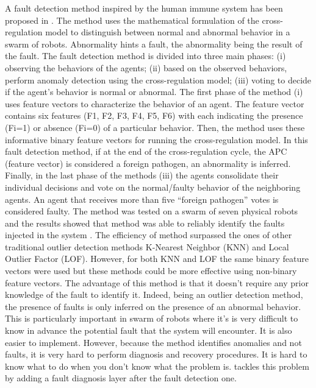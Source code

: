 A fault detection method inspired by the human immune system has been proposed in \cite{ tarapore2015err, tarapore2017generic}. The method uses the mathematical formulation of the cross-regulation model to distinguish between normal and abnormal behavior in a swarm of robots. Abnormality hints a fault, the abnormality being the result of the fault. The fault detection method is divided into three main phases: (i) observing the behaviors of the agents; (ii) based on the observed behaviors, perform anomaly detection using the cross-regulation model; (iii) voting to decide if the agent’s behavior is normal or abnormal.  The first phase of the method (i) uses feature vectors to characterize the behavior of an agent. The feature vector contains six features (F1, F2, F3, F4, F5, F6) with each indicating the presence (Fi=1) or absence (Fi=0) of a particular behavior. Then, the method uses these informative binary feature vectors for running the cross-regulation model. In this fault detection method, if at the end of the cross-regulation cycle, the APC (feature vector) is considered a foreign pathogen, an abnormality is inferred. Finally, in the last phase of the methods (iii) the agents consolidate their individual decisions and vote on the normal/faulty behavior of the neighboring agents. An agent that receives more than five “foreign pathogen” votes is considered faulty. The method was tested on a swarm of seven physical robots and the results showed that method was able to reliably identify the faults injected in the system \cite{tarapore2019fault}. The efficiency of method surpassed the ones of other traditional outlier detection methods K-Nearest Neighbor (KNN) and Local Outlier Factor (LOF). However, for both KNN and LOF the same binary feature vectors were used but these methods could be more effective using non-binary feature vectors. The advantage of this method is that it doesn’t require any prior knowledge of the fault to identify it. Indeed, being an outlier detection method, the presence of faults is only inferred on the presence of an abnormal behavior. This is particularly important in swarm of robots where it’s is very difficult to know in advance the potential fault that the system will encounter. It is also easier to implement. However, because the method identifies anomalies and not faults, it is very hard to perform diagnosis and recovery procedures. It is hard to know what to do when you don’t know what the problem is. \cite{okeefe2018adaptive} tackles this problem by adding a fault diagnosis layer after the fault detection one. 

